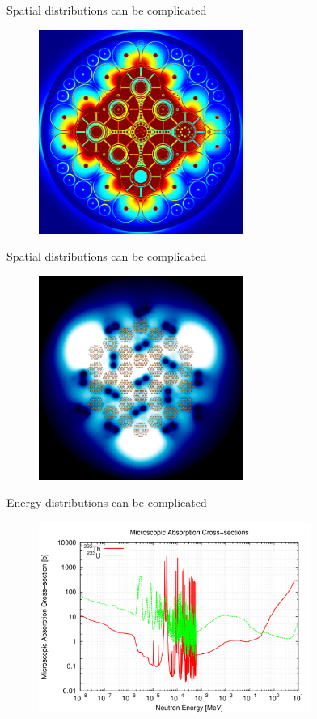 \documentclass{beamer}
\begin{document}
    \begin{frame}{Spatial distributions can be complicated}
        \begin{figure}
            \centering
            \includegraphics[width=18em]{./img/spaceFlux2.png}
            \caption*{}
        \end{figure}
    \end{frame}

    \begin{frame}{Spatial distributions can be complicated}
        \begin{figure}
            \centering
            \includegraphics[width=18em]{./img/spaceFlux3.png}
            \caption*{}
        \end{figure}
    \end{frame}

    \begin{frame}{Energy distributions can be complicated}
        \begin{figure}
            \centering
            \includegraphics[width=24em]{./img/energyXs.png}
            \caption*{}
        \end{figure}
    \end{frame}
\end{document}
